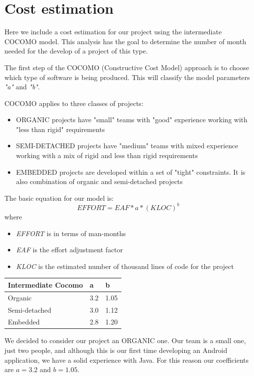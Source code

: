 \documentclass[a4paper]{scrreprt}
\begin{document}

\chapter{Cost estimation}
Here we include a cost estimation for our project using the intermediate COCOMO model. This analysis has the goal to determine the number of month needed for the develop of a project of this type.

The first step of the COCOMO (Constructive Cost Model) approach is to choose which type of software is being produced. This will classify the model parameters \emph{"a"} and \emph{"b"}.

COCOMO applies to three classes of projects:
\begin{itemize}
	\item ORGANIC projects have "small" teams with "good" experience working with "less than rigid" requirements
	\item SEMI-DETACHED projects have "medium" teams with mixed experience working with a mix of rigid and less than rigid requirements
	\item EMBEDDED projects are developed within a set of "tight" constraints. It is also combination of organic and semi-detached projects
\end{itemize}

The basic equation for our model is:
\[ EFFORT = EAF * a * (KLOC)^b  \]
where
\begin{itemize}
	\item \emph{EFFORT} is in terms of man-months
	\item \emph{EAF} is the effort adjustment factor
	\item \emph{KLOC} is the estimated number of thousand lines of code for the project
\end{itemize}

\bigskip
\noindent
\begin{tabularx}{\linewidth}{|X|l|l|}
	\hline
	\textbf{Intermediate Cocomo}	&\textbf{a}	&\textbf{b} \\ \hline
	Organic & 3.2 & 1.05 \\ \hline
	Semi-detached & 3.0 & 1.12 \\ \hline
	Embedded & 2.8 & 1.20 \\ \hline
\end{tabularx}
\bigskip

We decided to consider our project an ORGANIC one. Our team is a small one, just two people, and although this is our first time developing an Android application, we have a solid experience with Java. For this reason our coefficients are $ a = 3.2 $ and $ b = 1.05 $.
\end{document}
